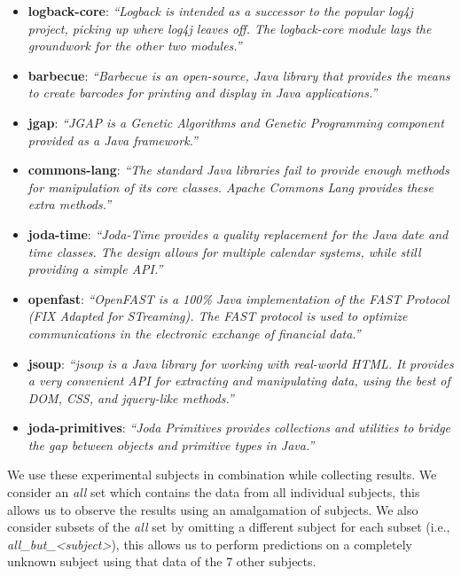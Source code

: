 \begin{itemize}
  \item \textbf{logback-core}: \emph{``Logback is intended as a successor to the popular log4j project, picking up where log4j leaves off. The logback-core module lays the groundwork for the other two modules.''}~\cite{logback}
  \item \textbf{barbecue}: \emph{``Barbecue is an open-source, Java library that provides the means to create barcodes for printing and display in Java applications.''}~\cite{barbecue}
  \item \textbf{jgap}: \emph{``JGAP is a Genetic Algorithms and Genetic Programming component provided as a Java framework.''}~\cite{jgap}
  \item \textbf{commons-lang}: \emph{``The standard Java libraries fail to provide enough methods for manipulation of its core classes. Apache Commons Lang provides these extra methods.''}\cite{commons-lang}
  \item \textbf{joda-time}: \emph{``Joda-Time provides a quality replacement for the Java date and time classes. The design allows for multiple calendar systems, while still providing a simple API.''}~\cite{joda-time}
  \item \textbf{openfast}: \emph{``OpenFAST is a 100\% Java implementation of the FAST Protocol (FIX Adapted for STreaming). The FAST protocol is used to optimize communications in the electronic exchange of financial data.''}~\cite{openfast}
  \item \textbf{jsoup}: \emph{``jsoup is a Java library for working with real-world HTML. It provides a very convenient API for extracting and manipulating data, using the best of DOM, CSS, and jquery-like methods.''}~\cite{jsoup}
  \item \textbf{joda-primitives}: \emph{``Joda Primitives provides collections and utilities to bridge the gap between objects and primitive types in Java.''}~\cite{joda-primitives}
\end{itemize}

We use these experimental subjects in combination while collecting results. We consider an \emph{all} set which contains the data from all individual subjects, this allows us to observe the results using an amalgamation of subjects. We also consider subsets of the \emph{all} set by omitting a different subject for each subset (i.e., \emph{all\_but\_<subject>}), this allows us to perform predictions on a completely unknown subject using that data of the 7 other subjects.


